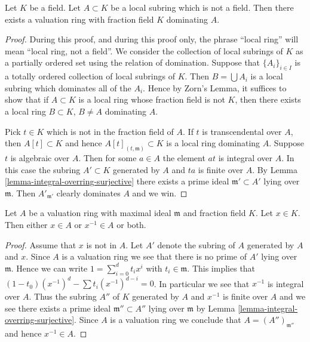 \begin{lemma}
\label{lemma-dominate}
Let $K$ be a field.
Let $A \subset K$ be a local subring which is not a field.
Then there exists a valuation ring with fraction field $K$
dominating $A$.
\end{lemma}

\begin{proof}
During this proof, and during this proof only, the phrase
``local ring'' will mean ``local ring, not a field''.
We consider the collection of local subrings
of $K$ as a partially ordered set using the relation of domination.
Suppose that $\{A_i\}_{i \in I}$ is a totally ordered
collection of local subrings of $K$. Then $B = \bigcup A_i$
is a local subring which dominates all of the $A_i$.
Hence by Zorn's Lemma, it suffices to show that if $A \subset K$
is a local ring whose fraction field is not $K$, then there
exists a local ring $B \subset K$, $B \not = A$ dominating $A$.

\medskip\noindent
Pick $t \in K$ which is not in the fraction field of $A$.
If $t$ is transcendental over $A$, then $A[t] \subset K$
and hence $A[t]_{(t, \mathfrak m)} \subset K$ is a local ring
dominating $A$.
Suppose $t$ is algebraic over $A$.
Then for some $a \in A$ the element $at$ is integral over $A$.
In this case the subring $A' \subset K$ generated by $A$ and
$ta$ is finite over $A$.
By Lemma \ref{lemma-integral-overring-surjective} there exists
a prime ideal $\mathfrak m' \subset A'$ lying over
$\mathfrak m$. Then $A'_{\mathfrak m'}$ clearly dominates
$A$ and we win.
\end{proof}

\begin{lemma}
\label{lemma-valuation-ring-x-or-x-inverse}
Let $A$ be a valuation ring with maximal ideal $\mathfrak m$ and
fraction field $K$.
Let $x \in K$. Then either $x \in A$ or $x^{-1} \in A$ or both.
\end{lemma}

\begin{proof}
Assume that $x$ is not in $A$.
Let $A'$ denote the subring of $A$ generated by $A$ and $x$.
Since $A$ is a valuation ring we see that there is no prime
of $A'$ lying over $\mathfrak m$. Hence we can write
$1 = \sum_{i = 0}^d t_i x^i$ with $t_i \in \mathfrak m$.
This implies that $(1 - t_0) (x^{-1})^d - \sum t_i (x^{-1})^{d - i} = 0$.
In particular we see that $x^{-1}$ is integral over $A$.
Thus the subring $A''$ of $K$ generated by $A$ and $x^{-1}$ is
finite over $A$ and we see there exists a prime ideal
$\mathfrak m'' \subset A''$ lying over $\mathfrak m$ by
Lemma \ref{lemma-integral-overring-surjective}. Since $A$
is a valuation ring we conclude that $A = (A'')_{\mathfrak m''}$
and hence $x^{-1} \in A$.
\end{proof}

